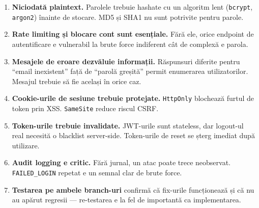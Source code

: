 \documentclass[12pt]{article}
\begin{document}
\begin{enumerate}
    \item \textbf{Niciodată plaintext.} Parolele trebuie hashate cu un algoritm lent
    (\texttt{bcrypt}, \texttt{argon2}) înainte de stocare. MD5 și SHA1 nu sunt potrivite
    pentru parole.

    \item \textbf{Rate limiting și blocare cont sunt esențiale.} Fără ele, orice endpoint
    de autentificare e vulnerabil la brute force indiferent cât de complexă e parola.

    \item \textbf{Mesajele de eroare dezvăluie informații.} Răspunsuri diferite pentru
    ``email inexistent'' față de ``parolă greșită'' permit enumerarea utilizatorilor.
    Mesajul trebuie să fie același în orice caz.

    \item \textbf{Cookie-urile de sesiune trebuie protejate.} \texttt{HttpOnly} blochează
    furtul de token prin XSS. \texttt{SameSite} reduce riscul CSRF.

    \item \textbf{Token-urile trebuie invalidate.} JWT-urile sunt stateless, dar logout-ul
    real necesită o blacklist server-side. Token-urile de reset se șterg imediat după utilizare.

    \item \textbf{Audit logging e critic.} Fără jurnal, un atac poate trece neobservat.
    \texttt{FAILED\_LOGIN} repetat e un semnal clar de brute force.

    \item \textbf{Testarea pe ambele branch-uri} confirmă că fix-urile funcționează și că
    nu au apărut regresii --- re-testarea e la fel de importantă ca implementarea.
\end{enumerate}
\end{document}
